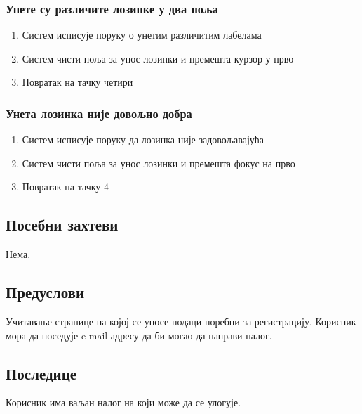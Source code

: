 \subsubsection{Унете су различите лозинке у два поља}
\begin{enumerate}[label=6.\arabic*]
    \item Систем исписује поруку о унетим различитим лабелама
    \item Систем чисти поља за унос лозинки и премешта курзор у прво
    \item Повратак на тачку четири
\end{enumerate}

\subsubsection{Унета лозинка није довољно добра}
\begin{enumerate}[label=7.\arabic*]
    \item Систем исписује поруку да лозинка није задовољавајућа
    \item Систем чисти поља за унос лозинки и премешта фокус на прво
    \item Повратак на тачку 4
\end{enumerate}

\subsection{Посебни захтеви}
Нема.

\subsection{Предуслови}
Учитавање странице на којој се уносе подаци поребни за регистрацију.
Корисник мора да поседује e-mail адресу да би могао да направи налог.

\subsection{Последице}
Корисник има ваљан налог на који може да се улогује. 
